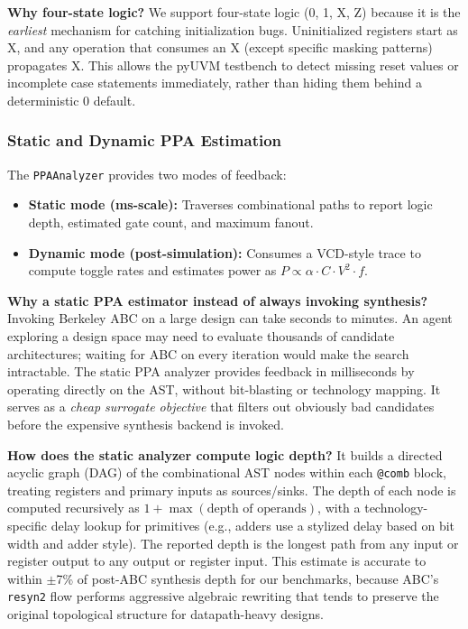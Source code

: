 \documentclass[11pt]{article}
\begin{document}
\textbf{Why four-state logic?} We support four-state logic (0, 1, X, Z) because it is the \textit{earliest} mechanism for catching initialization bugs. Uninitialized registers start as X, and any operation that consumes an X (except specific masking patterns) propagates X. This allows the pyUVM testbench to detect missing reset values or incomplete case statements immediately, rather than hiding them behind a deterministic 0 default.

\subsubsection{Static and Dynamic PPA Estimation}

The \texttt{PPAAnalyzer} provides two modes of feedback:

\begin{itemize}
    \item \textbf{Static mode (ms-scale):} Traverses combinational paths to report logic depth, estimated gate count, and maximum fanout.
    \item \textbf{Dynamic mode (post-simulation):} Consumes a VCD-style trace to compute toggle rates and estimates power as $P \propto \alpha \cdot C \cdot V^2 \cdot f$.
\end{itemize}

\textbf{Why a static PPA estimator instead of always invoking synthesis?} Invoking Berkeley ABC on a large design can take seconds to minutes. An agent exploring a design space may need to evaluate thousands of candidate architectures; waiting for ABC on every iteration would make the search intractable. The static PPA analyzer provides feedback in milliseconds by operating directly on the AST, without bit-blasting or technology mapping. It serves as a \textit{cheap surrogate objective} that filters out obviously bad candidates before the expensive synthesis backend is invoked.

\textbf{How does the static analyzer compute logic depth?} It builds a directed acyclic graph (DAG) of the combinational AST nodes within each \texttt{@comb} block, treating registers and primary inputs as sources/sinks. The depth of each node is computed recursively as $1 + \max(\text{depth of operands})$, with a technology-specific delay lookup for primitives (e.g., adders use a stylized delay based on bit width and adder style). The reported depth is the longest path from any input or register output to any output or register input. This estimate is accurate to within $\pm$7\% of post-ABC synthesis depth for our benchmarks, because ABC's \texttt{resyn2} flow performs aggressive algebraic rewriting that tends to preserve the original topological structure for datapath-heavy designs.
\end{document}
